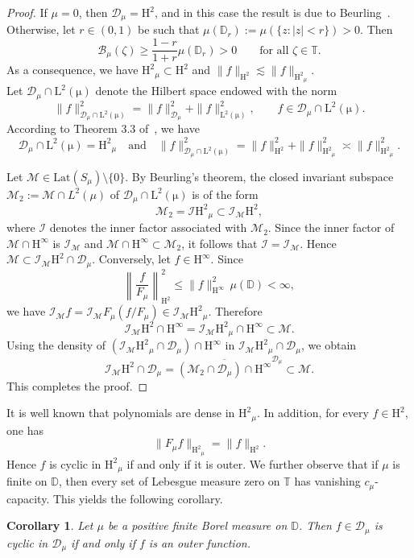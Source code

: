 \documentclass[12pt,reqno,a4paper]{amsart}
\newtheorem{coro}{Corollary}
\newcommand{\Lat}{\mathrm{Lat}}
\newcommand{\cM}{{\mathcal{M}}}
\newcommand{\kH}{\mathrm{H^\infty  }}
\newcommand{\hH}{\mathrm{H^2 }}
\newcommand{\IIIL}{\mathrm{L^2(\mu)}}
\newcommand\TT{\mathbb{T}}
\newcommand\DD{\mathbb{D}}
\newcommand{\cD}{{\mathcal{D}}}
\numberwithin{equation}{section}
\begin{document}
	\begin{proof}
		If $\mu = 0$, then $\cD_\mu = \hH$, and in this case the result is due to Beurling~\cite{Beur}.\\
		Otherwise, let $r \in (0,1)$ be such that $\mu(\DD_r) := \mu(\{ z : |z| < r \}) > 0$. Then
		\[
		\mathcal{B}_{\mu}(\zeta) \geq \frac{1 - r}{1 + r} \mu(\DD_r) > 0 
		\qquad \text{for all } \zeta \in \TT.
		\]
		As a consequence, we have $\hH_{\mu} \subset \hH$ and $\| f\|_{\hH} \lesssim \| f\|_{\hH_{\mu}}$.\\
		
		\noindent Let $\cD_\mu \cap \IIIL$ denote the Hilbert space endowed with the norm
		\[
		\| f\|^2_{\cD_\mu \cap \IIIL} = \| f\|^2_{\cD_\mu} + \|f\|^2_{\IIIL}, 
		\qquad f \in \cD_\mu \cap \IIIL.
		\]
		According to Theorem 3.3 of~\cite{BGP}, we have
		\[
		\cD_\mu \cap \IIIL = \hH_{\mu} 
		\quad \text{and} \quad 
		\| f\|^2_{\cD_\mu \cap \IIIL} = \| f\|^2_{\hH} + \| f\|^2_{\hH_{\mu}} \asymp \| f\|^2_{\hH_{\mu}}.
		\]
		
		\noindent Let $\cM \in \Lat (S_\mu)\setminus\{0\}$. 
		By Beurling's theorem, the closed invariant subspace $\cM_2 := \cM \cap L^2(\mu)$ of $\cD_\mu \cap \IIIL$ is of the form
		\[
		\cM_2 = \mathcal{I} \hH_{\mu} \subset \mathcal{I}_\cM \hH,
		\]
		where $\mathcal{I}$ denotes the inner factor associated with $\cM_2$.
		Since the inner factor of $\cM \cap \kH$ is $\mathcal{I}_\cM$ and $\cM \cap \kH \subset \cM_2$, it follows that $\mathcal{I}= \mathcal{I}_\cM$. Hence $\cM \subset \mathcal{I}_{\cM} \hH \cap \cD_\mu$. Conversely, let $f \in \kH$. Since
		\[
		\left\| \frac{f}{F_{\mu}} \right\|^2_\hH \leq \| f \|^2_\kH \, \mu(\DD) < \infty,
		\]
		we have $\mathcal{I}_{\cM} f = \mathcal{I}_{\cM} F_{\mu} \left( f / F_{\mu} \right) \in \mathcal{I}_{\cM} \hH_{\mu}$. Therefore
		\[
		\mathcal{I}_{\cM} \hH \cap \kH = \mathcal{I}_{\cM} \hH_{\mu} \cap \kH \subset \cM.
		\]
		Using the density of $(\mathcal{I}_{\cM} \hH_{\mu} \cap \cD_\mu) \cap \kH$ in $\mathcal{I}_{\cM} \hH_{\mu} \cap \cD_\mu$, we obtain
		\[
		\mathcal{I}_{\cM} \hH \cap \cD_\mu 
		= \overline{(\cM_2 \cap \cD_\mu) \cap \kH}^{\cD_\mu} \subset \cM.
		\]
		This completes the proof.
	\end{proof}
	
	It is well known that polynomials are dense in $\hH_{\mu}$. In addition, for every $f \in \hH$, one has
	\[
	\|F_{\mu} f\|_{\hH_{\mu}} = \|f\|_{\hH}.
	\]
	Hence $f$ is cyclic in $\hH_{\mu}$ if and only if it is outer.
	We further observe that if $\mu$ is finite on $\DD$, then every set of Lebesgue measure zero on $\TT$ has vanishing $c_{\mu}$-capacity. This yields the following corollary.
	\begin{coro}\label{Conj-BS-CM}
		Let $\mu$ be a positive finite Borel measure on $\DD$. Then $f \in \cD_\mu$ is cyclic in $\cD_\mu$ if and only if $f$ is an outer function.
	\end{coro}
	
\end{document}
